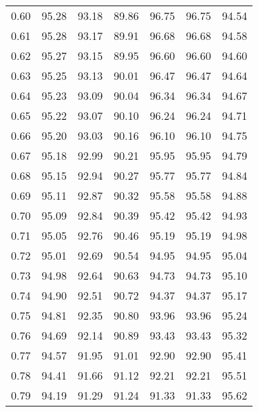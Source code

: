 \begin{tabular}{|c|c|c|c|c|c|c|}
      0.60 &     95.28 &     93.18 &      89.86 &   96.75 &      96.75 &         94.54 \\
      0.61 &     95.28 &     93.17 &      89.91 &   96.68 &      96.68 &         94.58 \\
      0.62 &     95.27 &     93.15 &      89.95 &   96.60 &      96.60 &         94.60 \\
      0.63 &     95.25 &     93.13 &      90.01 &   96.47 &      96.47 &         94.64 \\
      0.64 &     95.23 &     93.09 &      90.04 &   96.34 &      96.34 &         94.67 \\
      0.65 &     95.22 &     93.07 &      90.10 &   96.24 &      96.24 &         94.71 \\
      0.66 &     95.20 &     93.03 &      90.16 &   96.10 &      96.10 &         94.75 \\
      0.67 &     95.18 &     92.99 &      90.21 &   95.95 &      95.95 &         94.79 \\
      0.68 &     95.15 &     92.94 &      90.27 &   95.77 &      95.77 &         94.84 \\
      0.69 &     95.11 &     92.87 &      90.32 &   95.58 &      95.58 &         94.88 \\
      0.70 &     95.09 &     92.84 &      90.39 &   95.42 &      95.42 &         94.93 \\
      0.71 &     95.05 &     92.76 &      90.46 &   95.19 &      95.19 &         94.98 \\
      0.72 &     95.01 &     92.69 &      90.54 &   94.95 &      94.95 &         95.04 \\
      0.73 &     94.98 &     92.64 &      90.63 &   94.73 &      94.73 &         95.10 \\
      0.74 &     94.90 &     92.51 &      90.72 &   94.37 &      94.37 &         95.17 \\
      0.75 &     94.81 &     92.35 &      90.80 &   93.96 &      93.96 &         95.24 \\
      0.76 &     94.69 &     92.14 &      90.89 &   93.43 &      93.43 &         95.32 \\
      0.77 &     94.57 &     91.95 &      91.01 &   92.90 &      92.90 &         95.41 \\
      0.78 &     94.41 &     91.66 &      91.12 &   92.21 &      92.21 &         95.51 \\
      0.79 &     94.19 &     91.29 &      91.24 &   91.33 &      91.33 &         95.62 \\

\end{tabular}
